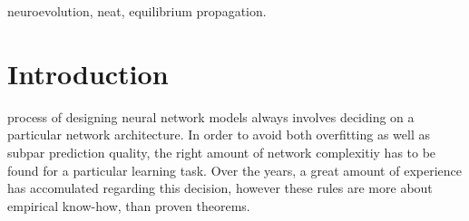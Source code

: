 \documentclass[lettersize,journal]{IEEEtran}
\begin{document}

\begin{IEEEkeywords}
neuroevolution, neat, equilibrium propagation.
\end{IEEEkeywords}

\section{Introduction}
 process of designing neural network models always involves deciding on a particular network architecture. In order to avoid both overfitting as well as subpar prediction quality, the right amount of network complexitiy has to be found for a particular learning task. Over the years, a great amount of experience has accomulated regarding this decision, however these rules are more about empirical know-how, than proven theorems. 
\end{document}
